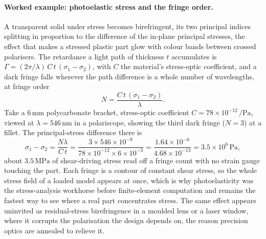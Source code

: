 \paragraph{Worked example: photoelastic stress and the fringe order.} A
transparent solid under stress becomes birefringent, its two principal indices
splitting in proportion to the difference of the in-plane principal stresses, the
effect that makes a stressed plastic part glow with colour bands between crossed
polarisers. The retardance a light path of thickness $t$ accumulates is
$\Gamma = (2\pi/\lambda)\,C\,t\,(\sigma_1 - \sigma_2)$, with $C$ the material's
stress-optic coefficient, and a dark fringe falls wherever the path difference is
a whole number of wavelengths, at fringe order
\[
N = \frac{C\,t\,(\sigma_1 - \sigma_2)}{\lambda} .
\]
Take a $6\,\si{\milli\meter}$ polycarbonate bracket, stress-optic coefficient
$C = 78\times 10^{-12}\,\si{\per\pascal}$, viewed at $\lambda = 546\,\si{\nano
\meter}$ in a polariscope, showing the third dark fringe ($N = 3$) at a fillet.
The principal-stress difference there is
\[
\sigma_1 - \sigma_2 = \frac{N\lambda}{C\,t}
= \frac{3\times 546\times 10^{-9}}{78\times 10^{-12}\times 6\times 10^{-3}}
= \frac{1.64\times 10^{-6}}{4.68\times 10^{-13}}
= 3.5\times 10^{6}\,\si{\pascal},
\]
about $3.5\,\si{\mega\pascal}$ of shear-driving stress read off a fringe count
with no strain gauge touching the part. Each fringe is a contour of constant
shear stress, so the whole stress field of a loaded model appears at once, which
is why photoelasticity was the stress-analysis workhorse before finite-element
computation and remains the fastest way to see where a real part concentrates
stress. The same effect appears uninvited as residual-stress birefringence in a
moulded lens or a laser window, where it corrupts the polarisation the design
depends on, the reason precision optics are annealed to relieve it.

